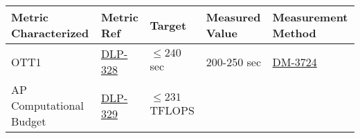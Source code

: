 \documentclass[DM,toc]{lsstdoc}
\begin{document}
\begin{longtable}[]{@{}lllll@{}}
\toprule
\begin{minipage}[b]{0.22\columnwidth}\raggedright\strut
Metric Characterized\strut
\end{minipage} & \begin{minipage}[b]{0.11\columnwidth}\raggedright\strut
Metric Ref\strut
\end{minipage} & \begin{minipage}[b]{0.21\columnwidth}\raggedright\strut
Target\strut
\end{minipage} & \begin{minipage}[b]{0.14\columnwidth}\raggedright\strut
Measured Value\strut
\end{minipage} & \begin{minipage}[b]{0.17\columnwidth}\raggedright\strut
Measurement Method\strut
\end{minipage}\tabularnewline
\midrule
\endhead
\begin{minipage}[t]{0.22\columnwidth}\raggedright\strut
OTT1\strut
\end{minipage} & \begin{minipage}[t]{0.11\columnwidth}\raggedright\strut
\href{https://jira.lsstcorp.org/browse/DLP-328}{DLP-328}\strut
\end{minipage} & \begin{minipage}[t]{0.21\columnwidth}\raggedright\strut
\(\leq 240\) sec\strut
\end{minipage} & \begin{minipage}[t]{0.14\columnwidth}\raggedright\strut
200-250 sec\strut
\end{minipage} & \begin{minipage}[t]{0.17\columnwidth}\raggedright\strut
\href{https://jira.lsstcorp.org/browse/DM-3724}{DM-3724}\strut
\end{minipage}\tabularnewline
\begin{minipage}[t]{0.22\columnwidth}\raggedright\strut
AP Computational Budget\strut
\end{minipage} & \begin{minipage}[t]{0.11\columnwidth}\raggedright\strut
\href{https://jira.lsstcorp.org/browse/DLP-329}{DLP-329}\strut
\end{minipage} & \begin{minipage}[t]{0.21\columnwidth}\raggedright\strut
\(\leq 231\) TFLOPS\strut
\end{minipage} & \begin{minipage}[t]{0.14\columnwidth}\raggedright\strut

\end{minipage}
\end{longtable}
\end{document}
